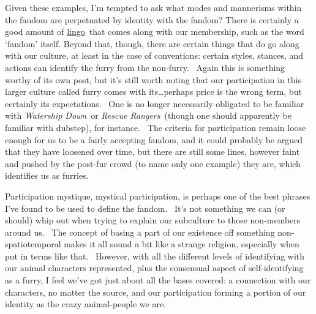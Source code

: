 Given these examples, I'm tempted to ask what modes and mannerisms
within the fandom are perpetuated by identity with the fandom? There is
certainly a good amount of
\href{http://en.wikifur.com/wiki/Category:Furspeech_terms}{lingo}~that
comes along with our membership, such as the word `fandom' itself.
Beyond that, though, there are certain things that do go along with our
culture, at least in the case of conventions: certain styles, stances,
and actions can identify the furry from the non-furry. ~Again this is
something worthy of its own post, but it's still worth noting that our
participation in this larger culture called furry comes with
its\ldots{}perhaps price is the wrong term, but certainly its
expectations. ~One is no longer necessarily obligated to be familiar
with \emph{Watership Down}~or \emph{Rescue Rangers}~(though one should
apparently be familiar with dubstep), for instance. ~The criteria for
participation remain loose enough for us to be a fairly accepting
fandom, and it could probably be argued that they have loosened over
time, but there are still some lines, however faint and pushed by the
post-fur crowd (to name only one example) they are, which identifies us
as furries.

Participation mystique, mystical participation, is perhaps one of the
best phrases I've found to be used to define the fandom. ~It's not
something we can (or should) whip out when trying to explain our
subculture to those non-members around us. ~The concept of basing a part
of our existence off something non-spatiotemporal makes it all sound a
bit like a strange religion, especially when put in terms like that.
~However, with all the different levels of identifying with our animal
characters represented, plus the consensual aspect of self-identifying
as a furry, I feel we've got just about all the bases covered: a
connection with our characters, no matter the source, and our
participation forming a portion of our identity as the crazy
animal-people we are.
